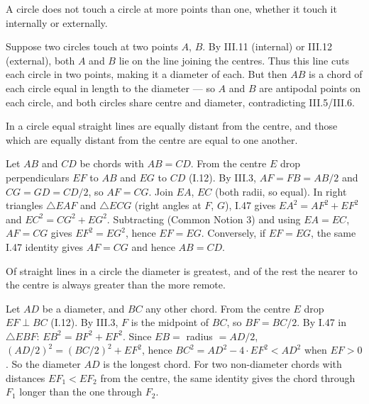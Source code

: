 \documentclass{rrxiv}
\begin{document}
\begin{claim}
\label{prop:III.13}
A circle does not touch a circle at more points than one, whether it
touch it internally or externally.
\end{claim}
\begin{evidence}
\label{ev:III.13}
Suppose two circles touch at two points $A$, $B$.  By III.11
(internal) or III.12 (external), both $A$ and $B$ lie on the line
joining the centres.  Thus this line cuts each circle in two
points, making it a diameter of each.  But then $AB$ is a chord of
each circle equal in length to the diameter --- so $A$ and $B$ are
antipodal points on each circle, and both circles share centre and
diameter, contradicting III.5/III.6.
\end{evidence}

\begin{claim}
\label{prop:III.14}
In a circle equal straight lines are equally distant from the centre,
and those which are equally distant from the centre are equal to one
another.
\end{claim}
\begin{evidence}
\label{ev:III.14}
Let $AB$ and $CD$ be chords with $AB = CD$.  From the centre $E$
drop perpendiculars $EF$ to $AB$ and $EG$ to $CD$ (I.12).  By III.3,
$AF = FB = AB/2$ and $CG = GD = CD/2$, so $AF = CG$.  Join $EA$,
$EC$ (both radii, so equal).  In right triangles $\triangle EAF$
and $\triangle ECG$ (right angles at $F$, $G$), I.47 gives $EA^2 =
AF^2 + EF^2$ and $EC^2 = CG^2 + EG^2$.  Subtracting (Common Notion
3) and using $EA = EC$, $AF = CG$ gives $EF^2 = EG^2$, hence $EF =
EG$.  Conversely, if $EF = EG$, the same I.47 identity gives $AF =
CG$ and hence $AB = CD$.
\end{evidence}

\begin{claim}
\label{prop:III.15}
Of straight lines in a circle the diameter is greatest, and of the
rest the nearer to the centre is always greater than the more remote.
\end{claim}
\begin{evidence}
\label{ev:III.15}
Let $AD$ be a diameter, and $BC$ any other chord.  From the centre
$E$ drop $EF \perp BC$ (I.12).  By III.3, $F$ is the midpoint of
$BC$, so $BF = BC/2$.  By I.47 in $\triangle EBF$: $EB^2 = BF^2 +
EF^2$.  Since $EB = $ radius $= AD/2$, $(AD/2)^2 = (BC/2)^2 +
EF^2$, hence $BC^2 = AD^2 - 4\cdot EF^2 < AD^2$ when $EF > 0$.  So
the diameter $AD$ is the longest chord.  For two non-diameter
chords with distances $EF_1 < EF_2$ from the centre, the same
identity gives the chord through $F_1$ longer than the one through
$F_2$.
\end{evidence}
\end{document}
